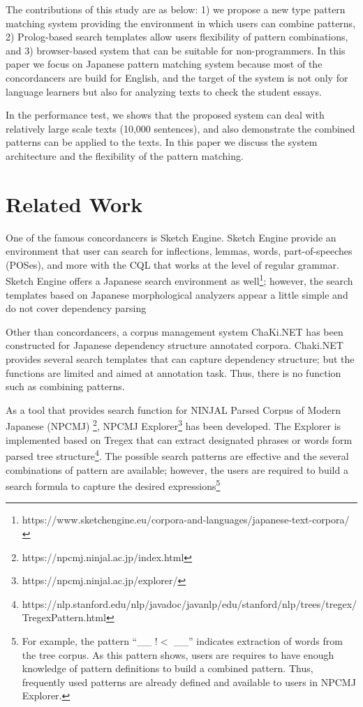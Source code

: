 \documentclass[conference]{IEEEtran}
\begin{document}
The contributions of this study are as below:
1) we propose a new type pattern matching system providing the environment in which users can
combine patterns, 
2) Prolog-based search templates allow users flexibility of pattern combinations, and 
3) browser-based system that can be suitable for non-programmers.
In this paper we focus on Japanese pattern matching system because 
most of the concordancers are build for English, and the target of the system is
not only for language learners but also for analyzing texts to check the student essays. 

In the performance test, we shows that the proposed system can deal with relatively large scale texts
(10,000 sentences), and also demonstrate the combined patterns can be applied to the texts.
In this paper we discuss the system architecture and the flexibility of the pattern matching. 

\section{Related Work}

One of the famous concordancers is Sketch Engine. Sketch Engine provide an environment
that user can search for inflections, lemmas, words, part-of-speeches (POSes), and more
with the CQL that works at the level of regular grammar.
Sketch Engine offers a Japanese search environment as well\footnote{https://www.sketchengine.eu/corpora-and-languages/japanese-text-corpora/}; however, the search templates
based on Japanese morphological analyzers appear a little simple and
do not cover dependency parsing

Other than concordancers, a corpus management system ChaKi.NET
\cite{asahara2016} has been constructed for Japanese dependency
structure annotated corpora. Chaki.NET provides several search
templates that can capture dependency structure; but the functions are
limited and aimed at annotation task. Thus, there is no function such
as combining patterns.

As a tool that provides search function for NINJAL Parsed Corpus of Modern Japanese (NPCMJ)
\footnote{https://npcmj.ninjal.ac.jp/index.html}\cite{Horn-et-al-2018},
NPCMJ Explorer\footnote{https://npcmj.ninjal.ac.jp/explorer/} has been developed. 
The Explorer is implemented based on Tregex \cite{roger2006} that can extract designated phrases or words form
parsed tree structure\footnote{https://nlp.stanford.edu/nlp/javadoc/javanlp/edu/stanford/nlp/trees/tregex/
TregexPattern.html}. The possible search patterns are effective and the several combinations of pattern
are available; however, the users are required to build a search formula to capture the desired expressions\footnote{For example, the pattern ``\_\_ !$<$ \_\_'' indicates extraction of words from the tree corpus.
As this pattern shows, users are requires to have enough knowledge of pattern definitions to build
a combined pattern. Thus, 
frequently used patterns are already defined and available to users in NPCMJ Explorer.}
\end{document}
